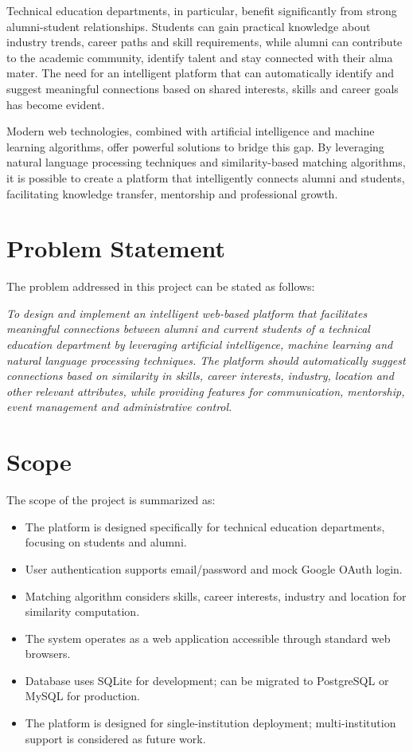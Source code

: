 \documentclass[12pt,a4paper]{report}
\let\origsection\section
\renewcommand{\section}{\needspace{4\baselineskip}\origsection}
\begin{document}
\medskip

\noindent
Technical education departments, in particular, benefit significantly from strong alumni-student relationships. Students can gain practical knowledge about industry trends, career paths and skill requirements, while alumni can contribute to the academic community, identify talent and stay connected with their alma mater. The need for an intelligent platform that can automatically identify and suggest meaningful connections based on shared interests, skills and career goals has become evident.

\medskip

\noindent
Modern web technologies, combined with artificial intelligence and machine learning algorithms, offer powerful solutions to bridge this gap. By leveraging natural language processing techniques and similarity-based matching algorithms, it is possible to create a platform that intelligently connects alumni and students, facilitating knowledge transfer, mentorship and professional growth.

\section{Problem Statement}

The problem addressed in this project can be stated as follows:

\medskip

\noindent
\emph{To design and implement an intelligent web-based platform that facilitates meaningful connections between alumni and current students of a technical education department by leveraging artificial intelligence, machine learning and natural language processing techniques. The platform should automatically suggest connections based on similarity in skills, career interests, industry, location and other relevant attributes, while providing features for communication, mentorship, event management and administrative control.}

\section{Scope}

The scope of the project is summarized as:

\begin{itemize}[noitemsep]
    \item The platform is designed specifically for technical education departments, focusing on students and alumni.
    \item User authentication supports email/password and mock Google OAuth login.
    \item Matching algorithm considers skills, career interests, industry and location for similarity computation.
    \item The system operates as a web application accessible through standard web browsers.
    \item Database uses SQLite for development; can be migrated to PostgreSQL or MySQL for production.
    \item The platform is designed for single-institution deployment; multi-institution support is considered as future work.
\end{itemize}
\end{document}
